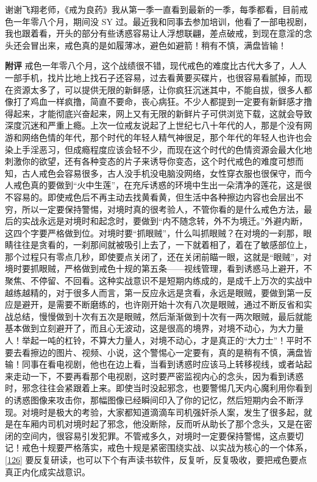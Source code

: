 \begin{case}
    谢谢飞翔老师，《戒为良药》我从第一季一直看到最新的一季，每季都看，目前戒色一年零八个月，期间没 SY 过。最近我和同事去参加培训，他看了一部电视剧，我也跟着看，开头的部分有些诱惑容易让人浮想联翩，差点破戒，到现在意淫的念头还会冒出来，戒色真的是如履薄冰，避色如避箭！稍有不慎，满盘皆输！

    \textbf{附评} 戒色一年零八个月，这个战绩很不错，现代戒色的难度比古代大多了，人人一部手机，找片比地上找石子还容易，过去看黄要买碟片，也很容易看腻掉，而现在资源太多了，可以提供无限的新鲜感，让你疯狂沉迷其中，不能自拔，很多人都像打了鸡血一样疯撸，简直不要命，丧心病狂。不少人都提到一定要有新鲜感才撸得起来，才能彻底兴奋起来，网上又有无限的新鲜片子可供浏览下载，这就会导致深度沉迷和严重上瘾。上次一位戒友说起了上世纪七八十年代的人，那是个没有网游和网络色情的年代，那个时代的年轻人精气神很足，那个年代的年轻人也许也会染上手淫恶习，但成瘾程度应该会轻不少，而现在这个时代的色情资源会最大化地刺激你的欲望，还有各种变态的片子来诱导你变态，这个时代戒色的难度可想而知，古人戒色会容易很多，古人没手机没电脑没网络，女性穿衣服也很保守，而今人戒色真的要做到“火中生莲”，在充斥诱惑的环境中生出一朵清净的莲花，这是很不容易的。即使戒色后不再主动去找黄看黄，但生活中各种擦边内容也会层出不穷，所以一定要保持警惕，对境时真的很考验人，不管你看的是什么戒色方法，最后的实战永远是对境时和起念时，要做到“内不随念转，外不为境迁。”外避内断，这四个字要严格做到位。对境时要“抓眼贼”，什么叫抓眼贼？在对境的一刹那，眼睛往往是贪看的，一刹那间就被吸引上去了，一下就着相了，着在了敏感部位上，那个过程只有零点几秒，即使要点关闭了，还在关闭前瞄一眼，这就是“眼贼”，对境时要抓眼贼，严格做到戒色十规的第五条——视线管理，看到诱惑马上避开，不聚焦、不停留、不回看。这种实战意识不是短期内练成的，是成千上万次的实战中越练越精的，对于很多人而言，第一反应永远是贪看，永远是眼贼，要做到第一反应是避开，是需要不断磨练的，也许刚开始十次有八次是眼贼，通过不断反省和实战总结，慢慢做到十次有五次是眼贼，然后渐渐做到十次有一两次眼贼，最后就能基本做到立刻避开了，而且心无波动，这是很高的境界，对境不动心，为大力量人！举起一吨的杠铃，不算大力量人，对境不动心，才是真正的“大力士”！平时不要去看擦边的图片、视频、小说，这个警惕心一定要有，真的是稍有不慎，满盘皆输！同事在看电视剧，他也在边上看，当看到诱惑时应该马上转移视线，或者站起来走动一下，不要再看那个电视剧，这时要严密监视内心的念头，因为看到诱惑时，邪念往往会紧跟着上来。即使当时没起邪念，也要警惕几天内心魔利用你看到的诱惑图像来攻击你，那幅图像已经瞬间印入了你的记忆，然后短期内会不断浮现。对境时是极大的考验，大家都知道滴滴车司机强奸杀人案，发生了很多起，就是在车厢内司机对境时起了邪念，他没断除，反而听从助长了那个念头，又是在密闭的空间内，很容易引发犯罪。不管戒多久，对境时一定要保持警惕，这点要切记！戒色十规要严格落实，戒色十规是紧密围绕实战、以实战为核心的一个体系，\ref{126} 要反复研读，也可以下个有声读书软件，反复听，反复吸收，要把戒色要点真正内化成实战意识。
\end{case}

